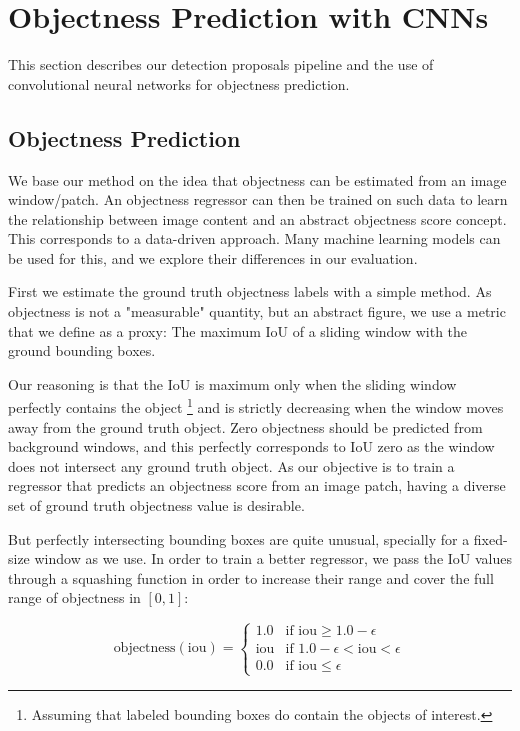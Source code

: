 \section{Objectness Prediction with CNNs}

This section describes our detection proposals pipeline and the use of convolutional neural networks for objectness prediction.

\subsection{Objectness Prediction}
\label{sec:objPrediction}

We base our method on the idea that objectness can be estimated from an image window/patch. An objectness regressor can then be trained on such data to learn the relationship between image content and an abstract objectness score concept. This corresponds to a data-driven approach. Many machine learning models can be used for this, and we explore their differences in our evaluation.

First we estimate the ground truth objectness labels with a simple method.  As objectness is not a "measurable" quantity, but an abstract figure, we use a metric that we define as a proxy: The maximum IoU of a sliding window with the ground bounding boxes.

Our reasoning is that the IoU is maximum only when the sliding window perfectly contains the object \footnote{Assuming that labeled bounding boxes do contain the objects of interest.} and is strictly decreasing when the window moves away from the ground truth object. Zero objectness should be predicted from background windows, and this perfectly corresponds to IoU zero as the window does not intersect any ground truth object. As our objective is to train a regressor that predicts an objectness score from an image patch, having a diverse set of ground truth objectness value is desirable. 

But perfectly intersecting bounding boxes are quite unusual, specially for a fixed-size window as we use. In order to train a better regressor, we pass the IoU values through a squashing function in order to increase their range and cover the full range of objectness in $[0, 1]$:

\begin{equation}
	\text{objectness}(\text{iou}) = 
	\begin{cases} 
		1.0 		& \text{if iou} \geq 1.0 - \epsilon \\
		\text{iou}  & \text{if } 1.0 - \epsilon < \text{iou} < \epsilon\\
		0.0      	& \text{if } \text{iou} \leq \epsilon
	\end{cases}
	\label{proposals:iouToObjectness}
\end{equation}

